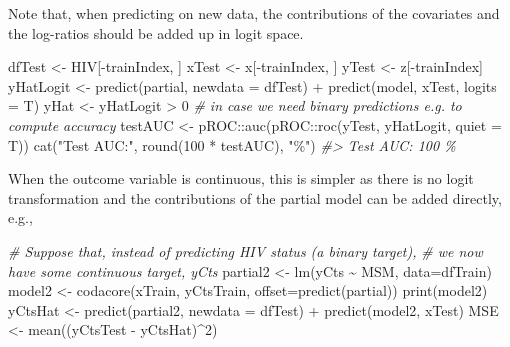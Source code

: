 \documentclass[
]{article}
\newenvironment{Shaded}{\begin{snugshade}}{\end{snugshade}}
\newcommand{\AttributeTok}[1]{\textcolor[rgb]{0.77,0.63,0.00}{#1}}
\newcommand{\CommentTok}[1]{\textcolor[rgb]{0.56,0.35,0.01}{\textit{#1}}}
\newcommand{\DecValTok}[1]{\textcolor[rgb]{0.00,0.00,0.81}{#1}}
\newcommand{\FunctionTok}[1]{\textcolor[rgb]{0.00,0.00,0.00}{#1}}
\newcommand{\NormalTok}[1]{#1}
\newcommand{\OtherTok}[1]{\textcolor[rgb]{0.56,0.35,0.01}{#1}}
\newcommand{\SpecialCharTok}[1]{\textcolor[rgb]{0.00,0.00,0.00}{#1}}
\newcommand{\StringTok}[1]{\textcolor[rgb]{0.31,0.60,0.02}{#1}}
\begin{document}
Note that, when predicting on new data, the contributions of the
covariates and the log-ratios should be added up in logit space.

\begin{Shaded}
\begin{Highlighting}[]
\NormalTok{dfTest }\OtherTok{\textless{}{-}}\NormalTok{ HIV[}\SpecialCharTok{{-}}\NormalTok{trainIndex, ]}
\NormalTok{xTest }\OtherTok{\textless{}{-}}\NormalTok{ x[}\SpecialCharTok{{-}}\NormalTok{trainIndex, ]}
\NormalTok{yTest }\OtherTok{\textless{}{-}}\NormalTok{ z[}\SpecialCharTok{{-}}\NormalTok{trainIndex]}
\NormalTok{yHatLogit }\OtherTok{\textless{}{-}} \FunctionTok{predict}\NormalTok{(partial, }\AttributeTok{newdata =}\NormalTok{ dfTest) }\SpecialCharTok{+}
    \FunctionTok{predict}\NormalTok{(model, xTest, }\AttributeTok{logits =}\NormalTok{ T)}
\NormalTok{yHat }\OtherTok{\textless{}{-}}\NormalTok{ yHatLogit }\SpecialCharTok{\textgreater{}} \DecValTok{0}  \CommentTok{\# in case we need binary predictions e.g. to compute accuracy}
\NormalTok{testAUC }\OtherTok{\textless{}{-}}\NormalTok{ pROC}\SpecialCharTok{::}\FunctionTok{auc}\NormalTok{(pROC}\SpecialCharTok{::}\FunctionTok{roc}\NormalTok{(yTest, yHatLogit,}
    \AttributeTok{quiet =}\NormalTok{ T))}
\FunctionTok{cat}\NormalTok{(}\StringTok{"Test AUC:"}\NormalTok{, }\FunctionTok{round}\NormalTok{(}\DecValTok{100} \SpecialCharTok{*}\NormalTok{ testAUC), }\StringTok{"\%"}\NormalTok{)}
\CommentTok{\#\textgreater{} Test AUC: 100 \%}
\end{Highlighting}
\end{Shaded}

When the outcome variable is continuous, this is simpler as there is no
logit transformation and the contributions of the partial model can be
added directly, e.g.,

\begin{Shaded}
\begin{Highlighting}[]
\CommentTok{\# Suppose that, instead of predicting HIV status (a binary target),}
\CommentTok{\# we now have some continuous target, \textquotesingle{}yCts\textquotesingle{}}
\NormalTok{partial2 }\OtherTok{\textless{}{-}} \FunctionTok{lm}\NormalTok{(yCts }\SpecialCharTok{\textasciitilde{}}\NormalTok{ MSM, }\AttributeTok{data=}\NormalTok{dfTrain)}
\NormalTok{model2 }\OtherTok{\textless{}{-}} \FunctionTok{codacore}\NormalTok{(xTrain, yCtsTrain, }\AttributeTok{offset=}\FunctionTok{predict}\NormalTok{(partial))}
\FunctionTok{print}\NormalTok{(model2)}
\NormalTok{yCtsHat }\OtherTok{\textless{}{-}} \FunctionTok{predict}\NormalTok{(partial2, }\AttributeTok{newdata =}\NormalTok{ dfTest) }\SpecialCharTok{+} \FunctionTok{predict}\NormalTok{(model2, xTest)}
\NormalTok{MSE }\OtherTok{\textless{}{-}} \FunctionTok{mean}\NormalTok{((yCtsTest }\SpecialCharTok{{-}}\NormalTok{ yCtsHat)}\SpecialCharTok{\^{}}\DecValTok{2}\NormalTok{)}
\end{Highlighting}
\end{Shaded}
\end{document}
